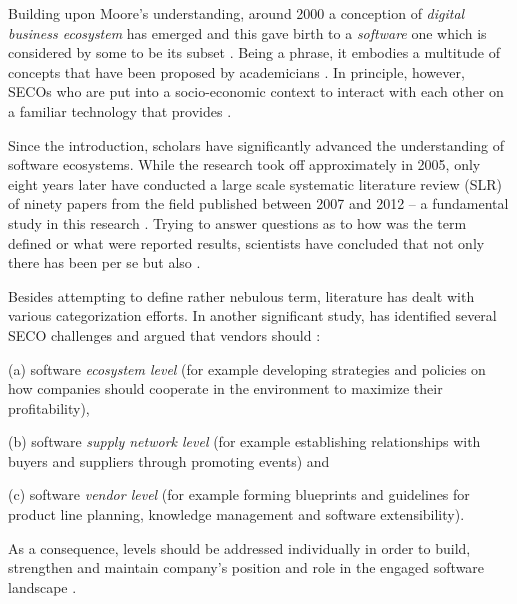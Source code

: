 Building upon Moore's understanding, around 2000 a conception of \emph{digital business ecosystem} has emerged and this gave birth to a \emph{software} one which is considered by some to be its subset \parencites{Peltoniemi2004BusinessEnvironments}{Plakidas2017EvolutionQualities}.
Being a  phrase, it embodies a multitude of concepts that have been proposed by academicians \parencite[29]{Manikas2016RevisitingStudy}.
In principle, however, \acp{SECO}  who are put into a socio-economic context to interact with each other on a familiar technology that provides  \parencites[1298]{HansenManikas2013}{Christensen2014AnalysisEcosystem}.

Since the introduction, scholars have significantly advanced the understanding of software ecosystems.
While the research took off approximately in 2005, only eight years later \textcite{HansenManikas2013} have conducted a large scale systematic literature review (\ac{SLR}) of ninety papers from the field published between 2007 and 2012 -- a fundamental study in this research \parencite{Manikas2016RevisitingStudy}.
Trying to answer questions as to how was the term defined or what were reported results, scientists have concluded that not only there has been  per se but also  \parencites[1294]{HansenManikas2013}.

Besides attempting to define rather nebulous term, literature has dealt with various categorization efforts.
In another significant study, \textcite{Jansen2009AEcosystems} has identified several \ac{SECO} challenges and argued that vendors should :
%
\begin{compactitem}
    \item [(a)] software \emph{ecosystem level} (for example developing strategies and policies on how companies should cooperate in the environment to maximize their profitability),
    \item [(b)] software \emph{supply network level} (for example establishing relationships with buyers and suppliers through promoting events) and 
    \item [(c)] software \emph{vendor level} (for example forming blueprints and guidelines for product line planning, knowledge management and software extensibility).
\end{compactitem}
%
As a consequence, levels should be addressed individually in order to build, strengthen and maintain company's position and role in the engaged software landscape \parencites[1477]{Christensen2014AnalysisEcosystem}. 

